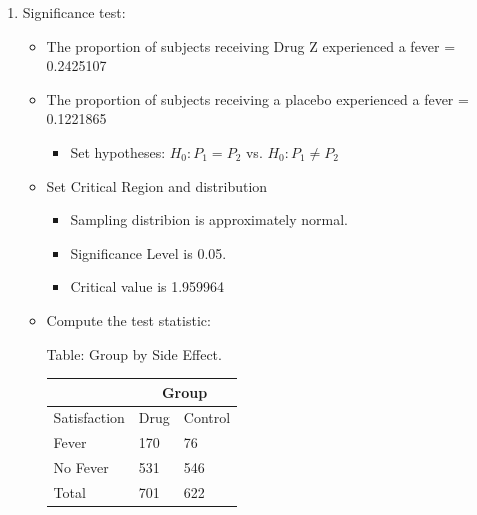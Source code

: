 \documentclass[11pt, chapterprefix=true]{scrbook}\usepackage[]{graphicx}\usepackage[]{color}
\begin{document}
\begin{exercises}
\begin{exercise}
\end{exercise}
\vspace{2mm}
\begin{solution}

\par\nobreak\vspace{\baselineskip}

  \begin{enumerate}
	 \item Significance test:


\begin{itemize}

\item The proportion of subjects receiving Drug Z experienced a fever = 0.2425107
\item The proportion of subjects receiving a placebo experienced a fever = 0.1221865
  \begin{itemize}
  \item Set hypotheses: $H_0: P_1 = P_2$ vs. $H_0: P_1 \ne P_2$
  \end{itemize}

\item Set Critical Region and distribution

  \begin{itemize}
  \item Sampling distribion is approximately normal.
  \item Significance Level is 0.05.
  \item Critical value is 1.959964
  \end{itemize}

\item Compute the test statistic:

\begin{minipage}[h]{6cm}

Table: Group  by Side Effect.

      \begin{tabular}{@{} p{2.5cm} p{1cm} p{1cm} @{}} \hline %
     &  \multicolumn{2}{c}{Group } \\ \hline
     Satisfaction   & Drug & Control \\ \hline
     Fever             & 170 & 76 \\
     No Fever          & 531 & 546 \\ \hline
     Total             & 701 & 622 \\ \hline
   \end{tabular}


\end{minipage}
\end{itemize}
\end{enumerate}
\end{solution}
\end{exercises}
\end{document}
